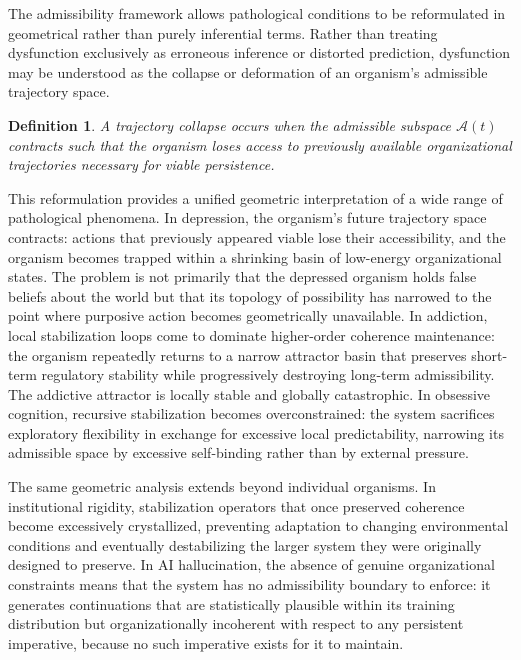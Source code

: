 \documentclass[12pt,a4paper]{report}
\theoremstyle{flyxion}
\newtheorem{definition}[theorem]{Definition}
\begin{document}
The admissibility framework allows pathological conditions to be reformulated in geometrical rather than purely inferential terms. Rather than treating dysfunction exclusively as erroneous inference or distorted prediction, dysfunction may be understood as the collapse or deformation of an organism's admissible trajectory space.

\begin{definition}
A \emph{trajectory collapse} occurs when the admissible subspace $\mathcal{A}(t)$ contracts such that the organism loses access to previously available organizational trajectories necessary for viable persistence.
\end{definition}

This reformulation provides a unified geometric interpretation of a wide range of pathological phenomena. In depression, the organism's future trajectory space contracts: actions that previously appeared viable lose their accessibility, and the organism becomes trapped within a shrinking basin of low-energy organizational states. The problem is not primarily that the depressed organism holds false beliefs about the world but that its topology of possibility has narrowed to the point where purposive action becomes geometrically unavailable. In addiction, local stabilization loops come to dominate higher-order coherence maintenance: the organism repeatedly returns to a narrow attractor basin that preserves short-term regulatory stability while progressively destroying long-term admissibility. The addictive attractor is locally stable and globally catastrophic. In obsessive cognition, recursive stabilization becomes overconstrained: the system sacrifices exploratory flexibility in exchange for excessive local predictability, narrowing its admissible space by excessive self-binding rather than by external pressure.

The same geometric analysis extends beyond individual organisms. In institutional rigidity, stabilization operators that once preserved coherence become excessively crystallized, preventing adaptation to changing environmental conditions and eventually destabilizing the larger system they were originally designed to preserve. In AI hallucination, the absence of genuine organizational constraints means that the system has no admissibility boundary to enforce: it generates continuations that are statistically plausible within its training distribution but organizationally incoherent with respect to any persistent imperative, because no such imperative exists for it to maintain.
\end{document}
